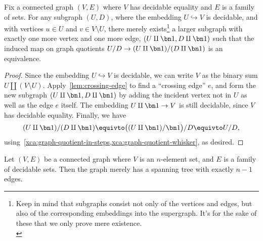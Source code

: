 \begin{lemma}\label{lem:spanning-tree-step}
  Fix a connected graph $(V,E)$ where $V$ has decidable equality and $E$ is a family of sets.
  For any subgraph $(U,D)$, where the embedding $U\hookrightarrow V$ is decidable,
  and with vertices $u \in U$ and $v \in V \setminus U$,
  there merely exists\footnote{%
    Keep in mind that subgraphs consist not only of the vertices and edges,
    but also of the corresponding embeddings into the supergraph.
    It's for the sake of these that we only prove mere existence.\\
    }
  a larger subgraph with exactly one more vertex and one more edge,
  $(U\amalg\bn 1, D\amalg\bn 1)$ such that the induced map on graph quotients
  $U/D \to (U\amalg\bn 1)/(D\amalg\bn 1)$ is an equivalence.
\end{lemma}
\begin{proof}
  Since the embedding $U\hookrightarrow V$ is decidable,
  we can write $V$ as the binary sum $U \amalg (V\setminus U)$.
  Apply~\cref{lem:crossing-edge} to find a ``crossing edge'' $e$,
  and form the new subgraph $(U\amalg\bn 1, D\amalg\bn 1)$ by adding
  the incident vertex not in $U$ as well as the edge $e$ itself.
  The embedding $U\amalg\bn 1 \to V$ is still decidable, since $V$ has decidable equality.
  Finally, we have
  \[
    (U\amalg\bn 1) / (D\amalg\bn 1) \equivto \bigl((U\amalg\bn 1)/\bn 1\bigr)/D
    \equivto U/D,
  \]
  using~\cref{xca:graph-quotient-in-steps,xca:graph-quotient-whisker}, as desired.
\end{proof}

\begin{lemma}\label{lem:spanning-tree}
  Let $(V,E)$ be a connected graph where $V$ is an $n$-element set,
  and $E$ is a family of decidable sets. Then the graph merely has a spanning tree
  with exactly $n-1$ edges.
\end{lemma}

